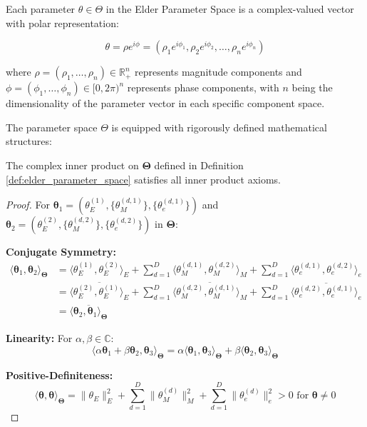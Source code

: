 \begin{definition}
Each parameter $\theta \in \Theta$ in the Elder Parameter Space is a complex-valued vector with polar representation:

\begin{equation}
\theta = \rho e^{i\phi} = (\rho_1 e^{i\phi_1}, \rho_2 e^{i\phi_2}, \ldots, \rho_n e^{i\phi_n})
\end{equation}

where $\rho = (\rho_1, \ldots, \rho_n) \in \mathbb{R}^n_+$ represents magnitude components and $\phi = (\phi_1, \ldots, \phi_n) \in [0, 2\pi)^n$ represents phase components, with $n$ being the dimensionality of the parameter vector in each specific component space.

The parameter space $\Theta$ is equipped with rigorously defined mathematical structures:
\end{definition}

\begin{lemma}
\label{lem:inner_product_verification}
The complex inner product on $\boldsymbol{\Theta}$ defined in Definition \ref{def:elder_parameter_space} satisfies all inner product axioms.
\end{lemma}

\begin{proof}
For $\boldsymbol{\theta}_1 = (\theta_E^{(1)}, \{\theta_M^{(d,1)}\}, \{\theta_e^{(d,1)}\})$ and $\boldsymbol{\theta}_2 = (\theta_E^{(2)}, \{\theta_M^{(d,2)}\}, \{\theta_e^{(d,2)}\})$ in $\boldsymbol{\Theta}$:

\textbf{Conjugate Symmetry:}
\begin{align}
\langle \boldsymbol{\theta}_1, \boldsymbol{\theta}_2 \rangle_{\boldsymbol{\Theta}} &= \langle \theta_E^{(1)}, \theta_E^{(2)} \rangle_E + \sum_{d=1}^D \langle \theta_M^{(d,1)}, \theta_M^{(d,2)} \rangle_M + \sum_{d=1}^D \langle \theta_e^{(d,1)}, \theta_e^{(d,2)} \rangle_e \\
&= \overline{\langle \theta_E^{(2)}, \theta_E^{(1)} \rangle_E} + \sum_{d=1}^D \overline{\langle \theta_M^{(d,2)}, \theta_M^{(d,1)} \rangle_M} + \sum_{d=1}^D \overline{\langle \theta_e^{(d,2)}, \theta_e^{(d,1)} \rangle_e} \\
&= \overline{\langle \boldsymbol{\theta}_2, \boldsymbol{\theta}_1 \rangle_{\boldsymbol{\Theta}}}
\end{align}

\textbf{Linearity:} For $\alpha, \beta \in \mathbb{C}$:
$$\langle \alpha\boldsymbol{\theta}_1 + \beta\boldsymbol{\theta}_2, \boldsymbol{\theta}_3 \rangle_{\boldsymbol{\Theta}} = \alpha\langle \boldsymbol{\theta}_1, \boldsymbol{\theta}_3 \rangle_{\boldsymbol{\Theta}} + \beta\langle \boldsymbol{\theta}_2, \boldsymbol{\theta}_3 \rangle_{\boldsymbol{\Theta}}$$

\textbf{Positive-Definiteness:}
$$\langle \boldsymbol{\theta}, \boldsymbol{\theta} \rangle_{\boldsymbol{\Theta}} = \|\theta_E\|_E^2 + \sum_{d=1}^D \|\theta_M^{(d)}\|_M^2 + \sum_{d=1}^D \|\theta_e^{(d)}\|_e^2 > 0 \text{ for } \boldsymbol{\theta} \neq 0$$
\end{proof}

